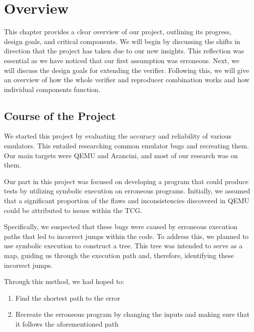 
\chapter{Overview}\label{chapter:overview}
This chapter provides a clear overview of our project, outlining its progress, design goals, and critical components.
We will begin by discussing the shifts in direction that the project has taken due to our new insights.
This reflection was essential as we have noticed that our first assumption was erroneous.
Next, we will discuss the design goals for extending the verifier.
Following this, we will give an overview of how the whole verifier and reproducer combination works and how individual components function.

\section{Course of the Project}
We started this project by evaluating the accuracy and reliability of various emulators.
This entailed researching common emulator bugs and recreating them.
Our main targets were \ac{QEMU} and Arancini, and most of our research was on them.

Our part in this project was focused on developing a program that could produce tests by utilizing symbolic execution on erroneous programs.
Initially, we assumed that a significant proportion of the flaws and inconsistencies discovered in \ac{QEMU} could be attributed to issues within the \ac{TCG}.

Specifically, we suspected that these bugs were caused by erroneous execution paths that led to incorrect jumps within the code. To address this, we planned to use symbolic execution to construct a tree.
This tree was intended to serve as a map, guiding us through the execution path and, therefore, identifying these incorrect jumps.

Through this method, we had hoped to:
\begin{enumerate}[label=(\Alph*)]
   \item Find the shortest path to the error
   \item Recreate the erroneous program by changing the inputs and making sure that it follows the aforementioned path
\end{enumerate}

